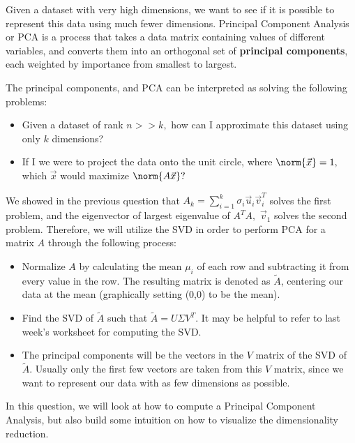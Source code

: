 

Given a dataset with very high dimensions, we want to see if it is possible to represent this data using much fewer dimensions.
Principal Component Analysis or PCA is a process that takes a data matrix containing values of different variables, and converts them into an orthogonal set of \textbf{principal components}, each weighted by importance from smallest to largest.

The principal components, and PCA can be interpreted as solving the following problems:
\begin{itemize}
  \item Given a dataset of rank $n >> k,$ how can I approximate this dataset using only $k$ dimensions?
  \item If I we were to project the data onto the unit circle, where $\norm{\vec{x}} = 1,$ which $\vec{x}$ would maximize $\norm{A \vec{x}}?$
\end{itemize}

We showed in the previous question that $A_{k} = \sum\limits_{i = 1}^{k} \sigma_{i} \vec{u}_{i} \vec{v}_{i}^{T}$ solves the first problem, and the eigenvector of largest eigenvalue of $A^{T}A,$ $\vec{v}_{1}$ solves the second problem. Therefore, we will utilize the SVD in order to perform PCA for a matrix $A$ through the following process:
\begin{itemize}
  \item Normalize $A$ by calculating the mean $\mu_{i}$ of each row and subtracting it from every value in the row. The resulting matrix is denoted as $\tilde{A}$, centering our data at the mean (graphically setting (0,0) to be the mean).
  \item Find the SVD of $\tilde{A}$ such that $\tilde{A} = U \Sigma V^T$. It may be helpful to refer to last week's worksheet for computing the SVD.
  \item The principal components will be the vectors in the $V$ matrix of the SVD of $\tilde{A}.$
  Usually only the first few vectors are taken from this $V$ matrix, since we want to represent our data with as few dimensions as possible.
\end{itemize}

In this question, we will look at how to compute a Principal Component Analysis, but also build some intuition on how to visualize the dimensionality reduction.

